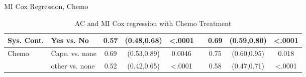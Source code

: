 \begin{frame}{MI Cox Regression, Chemo}
\begin{table}[]
{\begin{tabular}{|l|l|c|c|c|c|c|c|c|}
Sys. Cont.                     & Yes vs. No                       & 0.57                                                & (0.48,0.68)           & \textless .0001       &                       & 0.69                  & (0.59,0.80) & \textless .0001                                             \\ \hline
\rowcolor{red} 
Chemo                          & Cape. vs. none                   & 0.69                                                & (0.53,0.89)           & 0.0046                &                       & 0.75                  & (0.60,0.95) & 0.018                                                       \\ \hline
\rowcolor{red} 
                        
                        & other vs. none                   & 0.52                                                & (0.42,0.65)           & \textless .0001       &                       & 0.58                  & (0.47,0.71) & \textless .0001                                             \\ \hline
\end{tabular}
}
\caption{AC and MI Cox regression with Chemo Treatment}
\label{acmi_cox_chemo}
\end{table} 
\end{frame}



